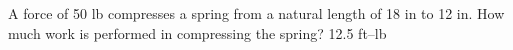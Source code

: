 {A force of 50 lb compresses a spring from a natural length of 18 in to 12 in. How much work is performed in compressing the spring?}
{12.5 ft--lb}
